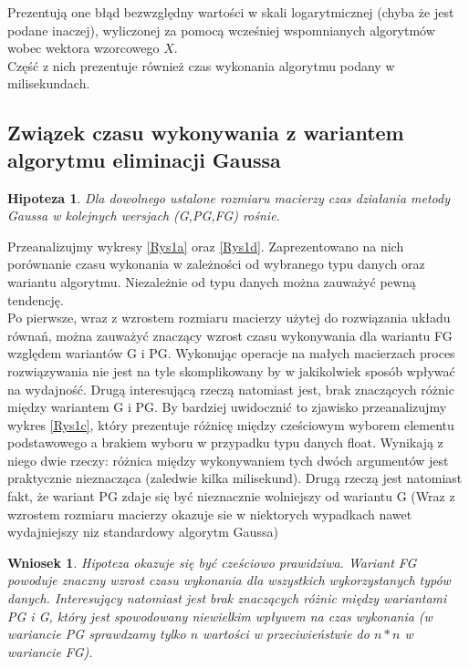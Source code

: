 \documentclass[10pt]{article}
\newtheorem{hip}{Hipoteza}
\newtheorem{wn}{Wniosek}
\begin{document}
Prezentują one błąd bezwzględny wartości w skali logarytmicznej (chyba że jest podane inaczej), wyliczonej za pomocą wcześniej wspomnianych algorytmów wobec wektora wzorcowego $X$.\\
Część z nich prezentuje również czas wykonania algorytmu podany w milisekundach.
\subsection{Związek czasu wykonywania z wariantem algorytmu eliminacji Gaussa}
\begin{hip}
	Dla dowolnego ustalone rozmiaru macierzy czas działania metody Gaussa w kolejnych wersjach (G,PG,FG) rośnie.\label{hip:1}
\end{hip}
Przeanalizujmy wykresy \ref{Rys1a} oraz \ref{Rys1d}. Zaprezentowano na nich porównanie czasu wykonania w zależności od wybranego typu danych oraz wariantu algorytmu. Niezależnie od typu danych można zauważyć pewną tendencję.\\
Po pierwsze, wraz z wzrostem rozmiaru macierzy użytej do rozwiązania układu równań, można zauważyć znaczący wzrost czasu wykonywania dla wariantu FG względem wariantów G i PG. Wykonując operacje na małych macierzach proces rozwiązywania nie jest na tyle skomplikowany by w jakikolwiek sposób wpływać na wydajność.
Drugą interesującą rzeczą natomiast jest, brak znaczących różnic między wariantem G i PG. By bardziej uwidocznić to zjawisko przeanalizujmy wykres \ref{Rys1c}, który prezentuje różnicę między cześciowym wyborem elementu podstawowego a brakiem wyboru w przypadku typu danych float. Wynikają z niego dwie rzeczy: różnica między wykonywaniem tych dwóch argumentów jest praktycznie nieznacząca (zaledwie kilka milisekund). Drugą rzeczą jest natomiast fakt, że wariant PG zdaje się być nieznacznie wolniejszy od wariantu G (Wraz z wzrostem rozmiaru macierzy okazuje sie w niektorych wypadkach nawet wydajniejszy niz standardowy algorytm Gaussa)
\begin{wn}
	Hipoteza okazuje się być cześciowo prawidziwa. Wariant FG powoduje znaczny wzrost czasu wykonania dla wszystkich wykorzystanych typów danych. Interesujący natomiast jest brak znaczących różnic między wariantami PG i G, który jest spowodowany niewielkim wpływem na czas wykonania (w wariancie PG sprawdzamy tylko $n$ wartości w przeciwieństwie do $n*n$ w wariancie FG).\label{wn:1}
\end{wn}
\end{document}
